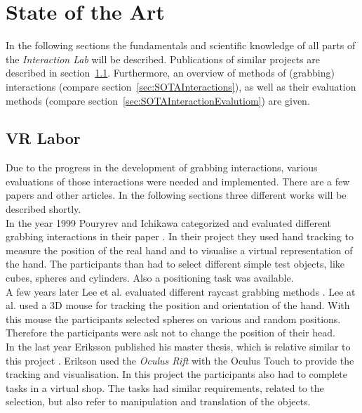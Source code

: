 \section{State of the Art} \label{sec:StateOfTheArt}
In the following sections the fundamentals and scientific knowledge of all parts of the \textit{Interaction Lab} will be described. Publications of similar projects are described in section~\ref{sec:SOTALabor}. Furthermore, an overview of methods of  (grabbing) interactions (compare section~\ref{sec:SOTAInteractions}), as well as their evaluation methods (compare section~\ref{sec:SOTAInteractionEvalutiom}) are given. 


\subsection{VR Labor}\label{sec:SOTALabor}
Due to the progress in the development of grabbing interactions, various evaluations of those interactions were needed and implemented. There are a few papers and other articles. In the following sections three different works will be described shortly. \\
In the year 1999 Pouryrev and Ichikawa categorized and evaluated different grabbing interactions in their paper \cite{POUPYREV199919}. In their project they used hand tracking to measure the position of the real hand and to visualise a virtual representation of the hand. The participants than had to select different simple test objects, like cubes, spheres and cylinders. Also a positioning task was available.\\
A few years later Lee et al. evaluated different raycast grabbing methods \cite{lee2003evaluation}. Lee at al. used a 3D mouse for tracking the position and orientation of the hand. With this mouse the participants selected spheres on various and random positions. Therefore the participants were ask not to change the position of their head.\\
In the last year Eriksson published his master thesis, which is relative similar to this project \cite{eriksson2016reaching}. Erikson used the \textit{Oculus Rift} \cite{website:Oculus} with the Oculus Touch to provide the tracking and visualisation. In this project the participants also had to complete tasks in a virtual shop. The tasks had similar requirements, related to the selection, but also refer to manipulation and translation of the objects. 

